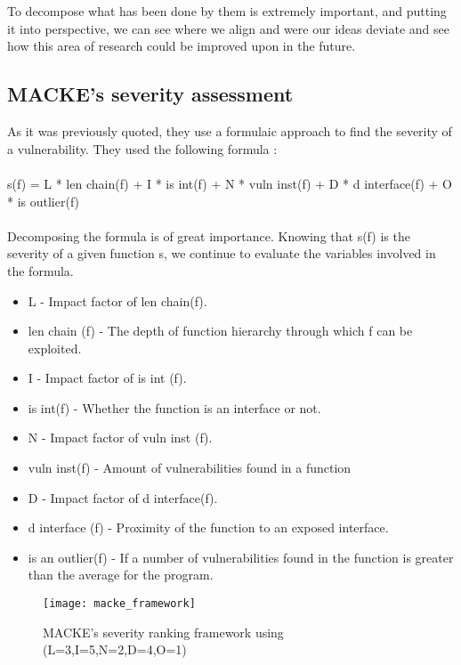 \\\\

To decompose what has been done by them is extremely important, and putting it into perspective, we can see where we align and were our ideas deviate and see how this area of research could be improved upon in the future.

\subsection{MACKE's severity assessment}

As it was previously quoted, they use a formulaic approach to find the severity of a vulnerability. They used the following formula : 
\\\\
s(f) = L * len chain(f) + I * is int(f) + N * vuln inst(f)
+ D * d interface(f) + O * is outlier(f)
\\\\
Decomposing the formula is of great importance. Knowing that s(f) is the severity of a given function s, we continue to evaluate the variables involved in the formula.

\begin{itemize}
	\item L - Impact factor of len chain(f).
	\item len chain (f) - The depth of function hierarchy through which f can be exploited.
	\item I - Impact factor of is int (f).
	\item is int(f) - Whether the function is an interface or not.
	\item N - Impact factor of vuln inst (f).
	\item vuln inst(f) - Amount of vulnerabilities found in a function
	\item D - Impact factor of d interface(f).
	\item d interface (f) -  Proximity of the function to an exposed interface.
	\item is an outlier(f) - If a number of vulnerabilities found in the function is greater than the average for the program.
\end{itemize}

\begin{figure}[!htb]
	\caption{MACKE's severity ranking framework using (L=3,I=5,N=2,D=4,O=1)}
	\centering
	\texttt{[image: macke\_framework]}
\end{figure}

